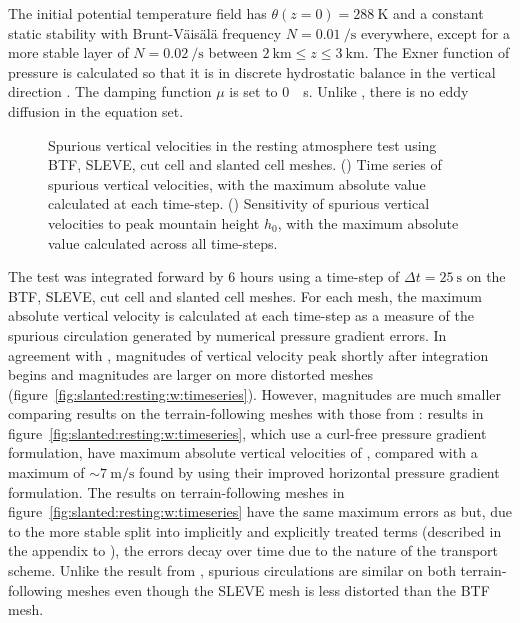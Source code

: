 The initial potential temperature field has $\theta(z = 0) = \SI{288}{\kelvin}$ and a constant static stability with Brunt-V\"ais\"al\"a frequency $N = \SI{0.01}{\per\second}$ everywhere, except for a more stable layer of $N = \SI{0.02}{\per\second}$ between $\SI{2}{\kilo\meter} \leq z \leq \SI{3}{\kilo\meter}$.  The Exner function of pressure is calculated so that it is in discrete hydrostatic balance in the vertical direction \citep{weller-shahrokhi2014}.  The damping function \(\mu\) is set to \SI{0}{\per\second}.  Unlike \citet{klemp2011}, there is no eddy diffusion in the equation set.

\begin{figure}
	\centering
	\begin{subfigure}{\textwidth}
		\centering
		
		\label{fig:slanted:resting:w:timeseries}
		\label{fig:slanted:resting:w:max}
	\end{subfigure}
	\caption{Spurious vertical velocities in the resting atmosphere test using BTF, SLEVE, cut cell and slanted cell meshes.
	() Time series of spurious vertical velocities, with the maximum absolute value calculated at each time-step. 
	() Sensitivity of spurious vertical velocities to peak mountain height $h_0$, with the maximum absolute value calculated across all time-steps.
	}
	\label{fig:slanted:resting:w}
\end{figure}

The test was integrated forward by \num{6} hours using a time-step of $\Delta t = \SI{25}{\second}$ on the BTF, SLEVE, cut cell and slanted cell meshes.
For each mesh, the maximum absolute vertical velocity is calculated at each time-step as a measure of the spurious circulation generated by numerical pressure gradient errors.  In agreement with \citep{klemp2011}, magnitudes of vertical velocity peak shortly after integration begins and magnitudes are larger on more distorted meshes (figure~\ref{fig:slanted:resting:w:timeseries}).
However, magnitudes are much smaller comparing results on the terrain-following meshes with those from \citet{klemp2011}: results in figure~\ref{fig:slanted:resting:w:timeseries}, which use a curl-free pressure gradient formulation, have maximum absolute vertical velocities of \unskip, compared with a maximum of $\sim \SI{7}{\meter\per\second}$ found by \citet{klemp2011} using their improved horizontal pressure gradient formulation.
The results on terrain-following meshes in figure~\ref{fig:slanted:resting:w:timeseries} have the same maximum errors as \citet{weller-shahrokhi2014} but, due to the more stable split into implicitly and explicitly treated terms (described in the appendix to \citet{shaw-weller2016}), the errors decay over time due to the  nature of the transport scheme.
Unlike the result from \citet{klemp2011}, spurious circulations are similar on both terrain-following meshes even though the SLEVE mesh is less distorted than the BTF mesh.

